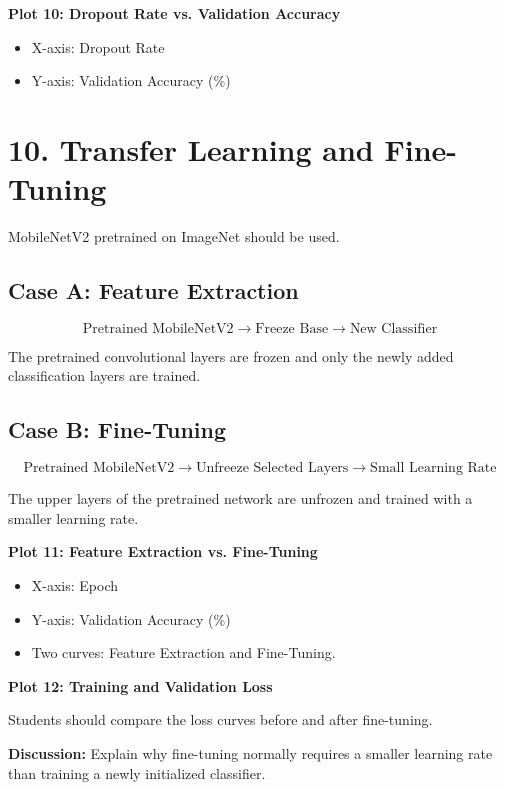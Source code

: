 \documentclass[10pt]{article}
\begin{document}
\textbf{Plot 10: Dropout Rate vs. Validation Accuracy}

\begin{itemize}
\item X-axis: Dropout Rate
\item Y-axis: Validation Accuracy (\%)
\end{itemize}

\section*{10. Transfer Learning and Fine-Tuning}

MobileNetV2 pretrained on ImageNet should be used.

\subsection*{Case A: Feature Extraction}

\[
\text{Pretrained MobileNetV2}
\rightarrow
\text{Freeze Base}
\rightarrow
\text{New Classifier}
\]

The pretrained convolutional layers are frozen and only the newly added
classification layers are trained.

\subsection*{Case B: Fine-Tuning}

\[
\text{Pretrained MobileNetV2}
\rightarrow
\text{Unfreeze Selected Layers}
\rightarrow
\text{Small Learning Rate}
\]

The upper layers of the pretrained network are unfrozen and trained with
a smaller learning rate.

\textbf{Plot 11: Feature Extraction vs. Fine-Tuning}

\begin{itemize}
\item X-axis: Epoch
\item Y-axis: Validation Accuracy (\%)
\item Two curves: Feature Extraction and Fine-Tuning.
\end{itemize}

\textbf{Plot 12: Training and Validation Loss}

Students should compare the loss curves before and after fine-tuning.

\textbf{Discussion:} Explain why fine-tuning normally requires a smaller
learning rate than training a newly initialized classifier.
\end{document}
